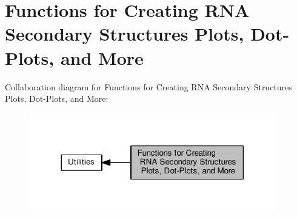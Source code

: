 \hypertarget{group__plotting__utils}{}\section{Functions for Creating R\+NA Secondary Structures Plots, Dot-\/\+Plots, and More}
\label{group__plotting__utils}
Collaboration diagram for Functions for Creating R\+NA Secondary Structures Plots, Dot-\/\+Plots, and More\+:
\nopagebreak
\begin{figure}[H]
\begin{center}
\leavevmode
\includegraphics[width=305pt]{group__plotting__utils}
\end{center}
\end{figure}
